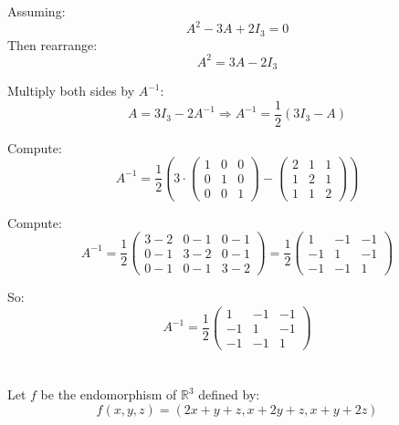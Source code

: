 \documentclass[12pt]{article}
\begin{document}
\begin{answerbox}
\begin{enumerate}
    Assuming:
    $$
    A^2 - 3A + 2I_3 = 0
    $$
    Then rearrange:
    $$
    A^2 = 3A - 2I_3
    $$

    Multiply both sides by $ A^{-1} $:
    $$
    A = 3I_3 - 2A^{-1} \Rightarrow A^{-1} = \frac{1}{2}(3I_3 - A)
    $$

    Compute:
    $$
    A^{-1} = \frac{1}{2}\left(3 \cdot \begin{pmatrix} 1 & 0 & 0 \\ 0 & 1 & 0 \\ 0 & 0 & 1 \end{pmatrix} - \begin{pmatrix} 2 & 1 & 1 \\ 1 & 2 & 1 \\ 1 & 1 & 2 \end{pmatrix} \right)
    $$

    Compute:
    $$
    A^{-1} = \frac{1}{2} \begin{pmatrix}
    3 - 2 & 0 - 1 & 0 - 1 \\
    0 - 1 & 3 - 2 & 0 - 1 \\
    0 - 1 & 0 - 1 & 3 - 2
    \end{pmatrix}
    = \frac{1}{2} \begin{pmatrix}
    1 & -1 & -1 \\
    -1 & 1 & -1 \\
    -1 & -1 & 1
    \end{pmatrix}
    $$

    So:
    $$
    \boxed{A^{-1} = \frac{1}{2} \begin{pmatrix}
    1 & -1 & -1 \\
    -1 & 1 & -1 \\
    -1 & -1 & 1
    \end{pmatrix}}
    $$
\end{enumerate}
\end{answerbox}

\newpage  
\section{}
Let $f$ be the endomorphism of $\mathbb{R}^3$ defined by:
\[
f(x,y,z) = (2x+y+z, x+2y+z, x+y+2z)
\]
\end{document}
